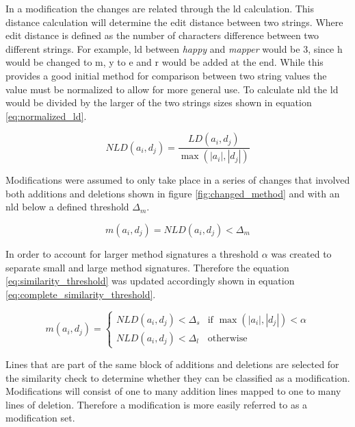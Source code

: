 In a modification the changes are related through the \gls{ld} calculation. This distance calculation will determine the edit distance between two strings. Where edit distance is defined as the number of characters difference between two different strings. For example, \gls{ld} between \textit{happy} and \textit{mapper} would be 3, since h would be changed to m, y to e and r would be added at the end. While this provides a good initial method for comparison between two string values the value must be normalized to allow for more general use. To calculate \gls{nld} the \gls{ld} would be divided by the larger of the two strings sizes shown in equation \ref{eq:normalized_ld}.


\begin{equation}
\label{eq:normalized_ld}
NLD(a_i, d_j) = \frac{LD(a_i, d_j)}{\max(|a_i|,|d_j|)}
\end{equation}

Modifications were assumed to only take place in a series of changes that involved both additions and deletions shown in figure \ref{fig:changed_method} and with an \gls{nld} below a defined threshold $\Delta_m$.

\begin{equation}
\label{eq:similarity_threshold}
m(a_i, d_j) = NLD(a_i, d_j) < \Delta_m
\end{equation}

In order to account for larger method signatures a threshold $\alpha$ was created to separate small and large method signatures. Therefore the equation \ref{eq:similarity_threshold} was updated accordingly shown in equation \ref{eq:complete_similarity_threshold}.

\begin{equation}
\label{eq:complete_similarity_threshold}
m(a_i, d_j) = \left\{\begin{matrix}
NLD(a_i, d_j) < \Delta_s & \text{if } \max(|a_i|, |d_j|) < \alpha \\ 
NLD(a_i, d_j) < \Delta_l & \text{otherwise}
\end{matrix}\right.
\end{equation}

Lines that are part of the same block of additions and deletions are selected for the similarity check to determine whether they can be classified as a modification. Modifications will consist of one to many addition lines mapped to one to many lines of deletion. Therefore a modification is more easily referred to as a modification set.

